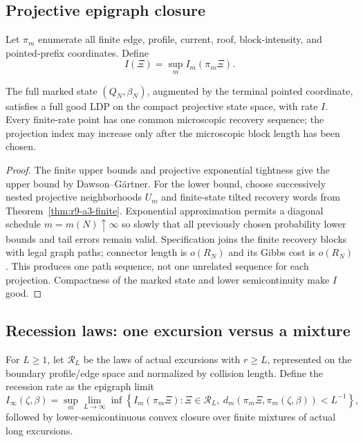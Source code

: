 \subsection{Projective epigraph closure}

Let $\pi_m$ enumerate all finite edge, profile, current, roof, block-intensity,
and pointed-prefix coordinates.  Define
\[
 I(\Xi)=\sup_m I_m(\pi_m\Xi).
\]

\begin{theorem}
\label{thm:r9-a3-projective}
The full marked state $(Q_N,\beta_N)$, augmented by the terminal pointed
coordinate, satisfies a full good LDP on the compact projective state space,
with rate $I$.  Every finite-rate point has one common microscopic recovery
sequence; the projection index may increase only after the microscopic block
length has been chosen.
\end{theorem}

\begin{proof}
The finite upper bounds and projective exponential tightness give the upper
bound by Dawson--G\"artner.  For the lower bound, choose successively nested
projective neighborhoods $U_m$ and finite-state tilted recovery words from
Theorem~\ref{thm:r9-a3-finite}.  Exponential approximation permits a diagonal
schedule $m=m(N)\uparrow\infty$ so slowly that all previously chosen
probability lower bounds and tail errors remain valid.  Specification joins
the finite recovery blocks with legal graph paths; connector length is
$o(R_N)$ and its Gibbs cost is $o(R_N)$.  This produces one path sequence, not
one unrelated sequence for each projection.  Compactness of the marked state
and lower semicontinuity make $I$ good.
\end{proof}

\subsection{Recession laws: one excursion versus a mixture}

For $L\ge1$, let $\mathcal R_L$ be the laws of actual excursions with
$r\ge L$, represented on the boundary profile/edge space and normalized by
collision length.  Define the recession rate as the epigraph limit
\[
 I_\infty(\zeta,\beta)
 =\sup_m\lim_{L\to\infty}
 \inf\left\{I_m(\pi_m\Xi):
 \Xi\in\mathcal R_L,\ 
 d_m(\pi_m\Xi,\pi_m(\zeta,\beta))<L^{-1}
 \right\},
\]
followed by lower-semicontinuous convex closure over finite mixtures of actual
long excursions.

